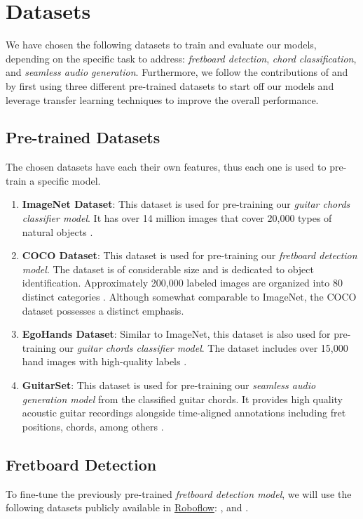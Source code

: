 \documentclass[10pt,twocolumn,letterpaper]{article}
\begin{document}
\section{Datasets}\label{sec:datasets}

We have chosen the following datasets to train and evaluate our models, depending on the specific task to address: \emph{fretboard detection}, \emph{chord classification}, and \emph{seamless audio generation}. Furthermore, we follow the contributions of \cite{Kristian_Zaman_Tenoyo_Jodhinata_2024} and \cite{Jadhav_transferlearning} by first using three different pre-trained datasets to start off our models and leverage transfer learning techniques to improve the overall performance.
\subsection{Pre-trained Datasets}
The chosen datasets have each their own features, thus each one is used to pre-train a specific model.

\begin{enumerate}[label=\arabic*), itemsep=0.25pt]
    \item \textbf{ImageNet Dataset}: This dataset is used for pre-training our \emph{guitar chords classifier model}. It has over 14 million images that cover 20,000 types of natural objects \cite{russakovsky2015imagenetlargescalevisual}.
    \item \textbf{COCO Dataset}: This dataset is used for pre-training our \emph{fretboard detection model}. The dataset is of considerable size and is dedicated to object identification. Approximately 200,000 labeled images are organized into 80 distinct categories \cite{lin2015microsoftcococommonobjects}. Although somewhat comparable to ImageNet, the COCO dataset possesses a distinct emphasis.
    \item \textbf{EgoHands Dataset}: Similar to ImageNet, this dataset is also used for pre-training our \emph{guitar chords classifier model}. The dataset includes over 15,000 hand images with high-quality labels \cite{Bambach_2015_ICCV}.
    \item \textbf{GuitarSet}: This dataset is used for pre-training our \emph{seamless audio generation model} from the classified guitar chords. It provides high quality acoustic guitar recordings alongside time-aligned annotations including fret positions, chords, among others \cite{Xi2018}.
\end{enumerate}

\subsection{Fretboard Detection}\label{subsec:fretboard-detection}
To fine-tune the previously pre-trained \emph{fretboard detection model}, we will use the following datasets publicly available in \href{https://universe.roboflow.com/}{Roboflow}: \cite{guitar-chords-daewp_dataset}, \cite{guitar-ppfil_dataset} and \cite{done-npcll_dataset}.
\end{document}
